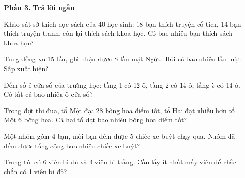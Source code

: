 \textbf{Phần 3. Trả lời ngắn}

\begin{ex} %
Khảo sát sở thích đọc sách của 40 học sinh: 18 bạn thích truyện cổ tích, 14 bạn thích truyện tranh, còn lại thích sách khoa học. Có bao nhiêu bạn thích sách khoa học?
\end{ex}

\begin{ex} %
Tung đồng xu 15 lần, ghi nhận được 8 lần mặt Ngửa. Hỏi có bao nhiêu lần mặt Sấp xuất hiện?
\end{ex}

\begin{ex} %
Đếm số ô cửa sổ của trường học: tầng 1 có 12 ô, tầng 2 có 14 ô, tầng 3 có 14 ô. Có tất cả bao nhiêu ô cửa sổ?
\end{ex}

\begin{ex} %
Trong đợt thi đua, tổ Một đạt 28 bông hoa điểm tốt, tổ Hai đạt nhiều hơn tổ Một 6 bông hoa. Cả hai tổ đạt bao nhiêu bông hoa điểm tốt?
\end{ex}

\begin{ex} %
Một nhóm gồm 4 bạn, mỗi bạn đếm được 5 chiếc xe buýt chạy qua. Nhóm đã đếm được tổng cộng bao nhiêu chiếc xe buýt?
\end{ex}

\begin{ex} %
Trong túi có 6 viên bi đỏ và 4 viên bi trắng. Cần lấy ít nhất mấy viên để chắc chắn có 1 viên bi đỏ?
\end{ex}
